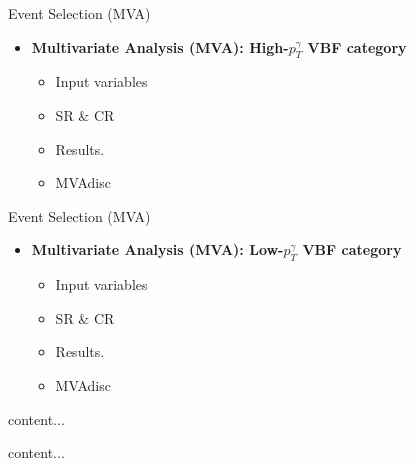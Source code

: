 \documentclass[9pt,aspectratio=1610]{beamer}
\newcommand{\khl}[1]{\textbf{\color{structure}#1}}
\begin{document}
\begin{frame}{Event Selection (MVA)}
	\begin{itemize}
		\item \khl{Multivariate Analysis (MVA): High-\(p^\gamma_T\) VBF category}
		\vspace{1em}
		\begin{itemize}
			\item Input variables
			\item SR \& CR
			\item Results.
			\item MVAdisc
		\end{itemize}
	\end{itemize}
\end{frame}

\begin{frame}{Event Selection (MVA)}
	\begin{itemize}
		\item \khl{Multivariate Analysis (MVA): Low-\(p^\gamma_T\) VBF category}
		\vspace{1em}
		\begin{itemize}
			\item Input variables
			\item SR \& CR
			\item Results.
			\item MVAdisc
		\end{itemize}
	\end{itemize}
\end{frame}

% 
\begin{frame}
	content...
\end{frame}

% 
\begin{frame}
	content...
\end{frame}
\end{document}
